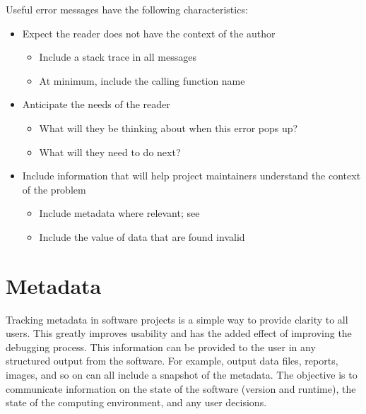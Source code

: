 \documentclass[]{nrel}
\begin{document}
Useful error messages have the following characteristics:
\begin{itemize}

\item Expect the reader does not have the context of the author
\begin{itemize}
\item Include a stack trace in all messages
\item At minimum, include the calling function name
\end{itemize}

\item Anticipate the needs of the reader
\begin{itemize}
\item What will they be thinking about when this error pops up?
\item What will they need to do next?
\end{itemize}

\item Include information that will help project maintainers understand the context of the problem
\begin{itemize}
\item Include metadata where relevant; see 
\item Include the value of data that are found invalid
\end{itemize}

\end{itemize}


\section{Metadata}
\label{sec:metadata}
Tracking metadata in software projects is a simple way to provide clarity to all users.
This greatly improves usability and has the added effect of improving the debugging process.
This information can be provided to the user in any structured output from the software.
For example, output data files, reports, images, and so on can all include a snapshot of the metadata.
The objective is to communicate information on the state of the software (version and runtime),
the state of the computing environment, and any user decisions.
\end{document}
